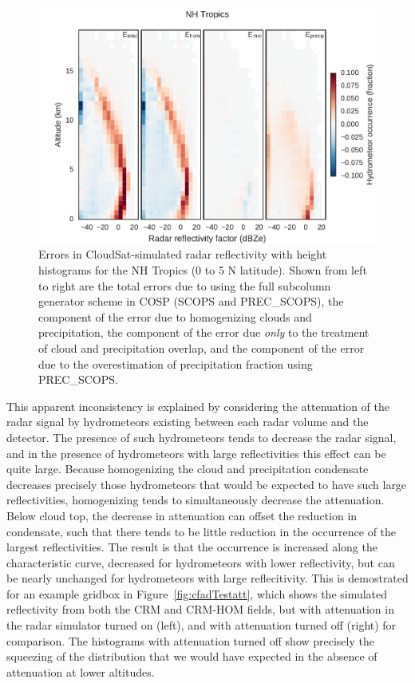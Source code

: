 \begin{figure}[htbp]
\centering
\includegraphics{graphics/subgrid1_cfadDbze94_NHTropics_diff.pdf}
\caption{\label{fig:cfadTropicsMroDiff}Errors in CloudSat-simulated
radar reflectivity with height histograms for the NH Tropics (0 to 5 N
latitude). Shown from left to right are the total errors due to using
the full subcolumn generator scheme in COSP (SCOPS and PREC\_SCOPS), the
component of the error due to homogenizing clouds and precipitation, the
component of the error due \emph{only} to the treatment of cloud and
precipitation overlap, and the component of the error due to the
overestimation of precipitation fraction using
PREC\_SCOPS.}\label{fig:cfadTropicsMroDiff}
\end{figure}

This apparent inconsistency is explained by considering the attenuation
of the radar signal by hydrometeors existing between each radar volume
and the detector. The presence of such hydrometeors tends to decrease
the radar signal, and in the presence of hydrometeors with large
reflectivities this effect can be quite large. Because homogenizing the
cloud and precipitation condensate decreases precisely those
hydrometeors that would be expected to have such large reflectivities,
homogenizing tends to simultaneously decrease the attenuation. Below
cloud top, the decrease in attenuation can offset the reduction in
condensate, such that there tends to be little reduction in the
occurrence of the largest reflectivities. The result is that the
occurrence is increased along the characteristic curve, decreased for
hydrometeors with lower reflectivity, but can be nearly unchanged for
hydrometeors with large reflecitivity. This is demostrated for an
example gridbox in Figure~\ref{fig:cfadTestatt}, which shows the
simulated reflectivity from both the CRM and CRM-HOM fields, but with
attenuation in the radar simulator turned on (left), and with
attenuation turned off (right) for comparison. The histograms with
attenuation turned off show precisely the squeezing of the distribution
that we would have expected in the absence of attenuation at lower
altitudes.

